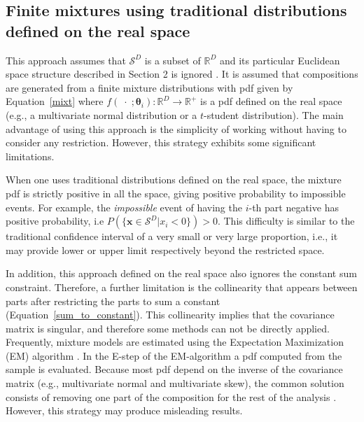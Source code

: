 \documentclass[12pt, a4paper]{article}
\newcommand{\m}[1]{\boldsymbol{#1}}
\theoremstyle{definition}
\begin{document}
\subsection{Finite mixtures using traditional distributions defined on the real space}
\label{real_section}

This approach assumes that $\mathcal{S}^D$ is a subset of $\mathbb{R}^D$ and its particular Euclidean space structure described in Section 2 is ignored \citep[][]{papageorgiou2001model}. It is assumed that compositions  are generated from a finite mixture distributions with pdf given by Equation~\ref{mixt} where $f(\;\cdot\;;\m\theta_i): \mathbb{R}^D \rightarrow \mathbb{R}^+$ is a pdf defined on the real space (e.g., a multivariate normal distribution or a  $t$-student distribution). The main advantage of using this approach is the simplicity of working without having to consider any restriction. However, this strategy exhibits some significant limitations.

When one uses traditional distributions defined on the real space, the mixture pdf is strictly positive in all the space, giving positive probability to impossible events. For example, the \emph{impossible} event  of having the $i$-th part negative has positive probability, i.e $P(\{ \textbf{x} \in \mathcal{S}^D | x_i < 0 \}) > 0$. This difficulty is similar to the traditional confidence interval of a very small or very large proportion, i.e., it may provide lower or upper limit respectively beyond the restricted space. 

In addition, this approach defined on the real space also ignores the constant sum constraint. Therefore, a further limitation is the collinearity that appears between parts  after restricting the parts to sum a constant (Equation~\ref{sum_to_constant}). This collinearity implies that the covariance matrix is singular, and therefore some methods can not be directly applied. Frequently, mixture models are estimated using the Expectation Maximization (EM) algorithm \citep{dempster1977maximum}. In the E-step of the EM-algorithm a pdf computed from the sample is evaluated. Because most pdf depend on the inverse of the covariance matrix (e.g., multivariate normal and multivariate skew), the common solution consists of removing one part of the composition for the rest of the analysis \citep{papageorgiou2001model}. However, this strategy may  produce misleading results.   
\end{document}
